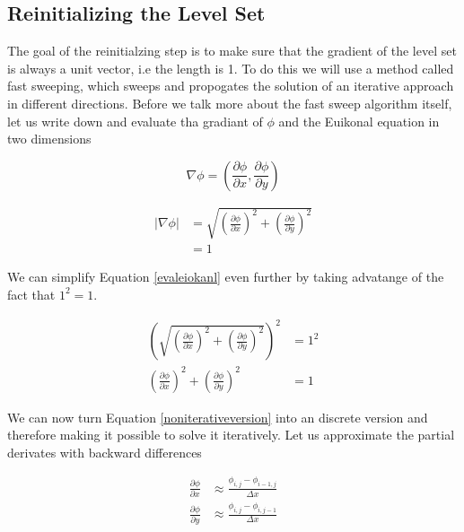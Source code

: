 \subsection{Reinitializing the Level Set}

The goal of the reinitialzing step is to make sure that the gradient of the level set is always a unit vector, i.e the length is 1. To do this we will use a method called fast sweeping, which sweeps and propogates the solution of an iterative approach in different directions. Before we talk more about the fast sweep algorithm itself, let us write down and evaluate tha gradiant of $\phi$ and the Euikonal equation in two dimensions

\begin{equation}
\nabla \phi = (\frac{\partial \phi}{\partial x}, \frac{\partial \phi}{\partial y})
\end{equation}

\begin{equation}
\begin{split}
|\nabla \phi| &= \sqrt{{(\frac{\partial \phi}{\partial x})}^2 + {(\frac{\partial \phi}{\partial y})}^2} \\
&= 1
\end{split}
\label{evaleiokanl}
\end{equation}

We can simplify Equation \ref{evaleiokanl} even further by taking advatange of the fact that $1^2 = 1$.

\begin{equation}
\begin{split}
{(\sqrt{{(\frac{\partial \phi}{\partial x})}^2 + {(\frac{\partial \phi}{\partial y})}^2})}^2 &= 1^2 \\
{(\frac{\partial \phi}{\partial x})}^2 + {(\frac{\partial \phi}{\partial y})}^2 &= 1
\end{split}
\label{noniterativeversion}
\end{equation}

We can now turn Equation \ref{noniterativeversion} into an discrete version and therefore making it possible to solve it iteratively. Let us approximate the partial derivates with backward differences

\begin{equation}
\begin{split}
\frac{\partial \phi}{\partial x} &\approx \frac{\phi_{i,j} - \phi_{i-1,j}}{\Delta x} \\
\frac{\partial \phi}{\partial y} &\approx \frac{\phi_{i,j} - \phi_{i,j-1}}{\Delta x}
\end{split}
\label{phiapproxeq}
\end{equation}

